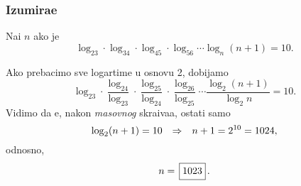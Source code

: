 \subsubsection{Izumira{\nj}e}

\zadatak Na{\dj}i $n$ ako je
$$
\log_23\cdot\log_34\cdot\log_45\cdot\log_56\cdots\log_n(n+1)=10.
$$

\resenje
Ako prebacimo sve logartime u osnovu 2, dobijamo
$$
\log_23
\cdot\frac{\log_24}{\log_23}
\cdot\frac{\log_25}{\log_24}
\cdot\frac{\log_26}{\log_25}
\cdots\frac{\log_2(n+1)}{\log_2n}=10.
$$
Vidimo da {\cc}e, nakon {\sl masovnog\/} skra{\cc}iva{\nj}a, ostati samo
$$
\log_2(n+1)=10{\quad\Rightarrow\quad} n+1 = 2^{10}=1024,
$$
odnosno,
$$
n=\ram{1023}.
$$

